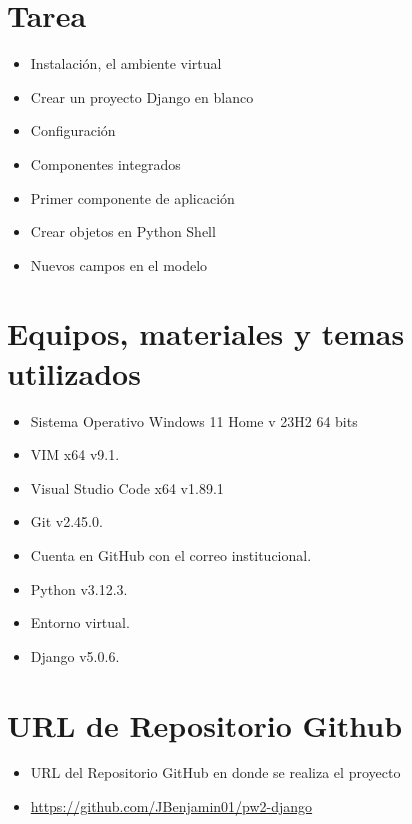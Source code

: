 \documentclass{article}
\begin{document}
	\section{Tarea}
	\begin{itemize}		
            \item Instalación, el ambiente virtual
            \item Crear un proyecto Django en blanco
            \item Configuración
            \item Componentes integrados
            \item Primer componente de aplicación
            \item Crear objetos en Python Shell
            \item Nuevos campos en el modelo
	\end{itemize}
		
	\section{Equipos, materiales y temas utilizados}
	\begin{itemize}
            \item Sistema Operativo Windows 11 Home v 23H2 64 bits
            \item VIM x64 v9.1.
            \item Visual Studio Code x64 v1.89.1
            \item Git v2.45.0.
            \item Cuenta en GitHub con el correo institucional.
            \item Python v3.12.3.
            \item Entorno virtual.
            \item Django v5.0.6.
	\end{itemize}
	
	\section{URL de Repositorio Github}
	\begin{itemize}
            \item URL del Repositorio GitHub en donde se realiza el proyecto
            \item \url{https://github.com/JBenjamin01/pw2-django}
	\end{itemize}

	
\end{document}
